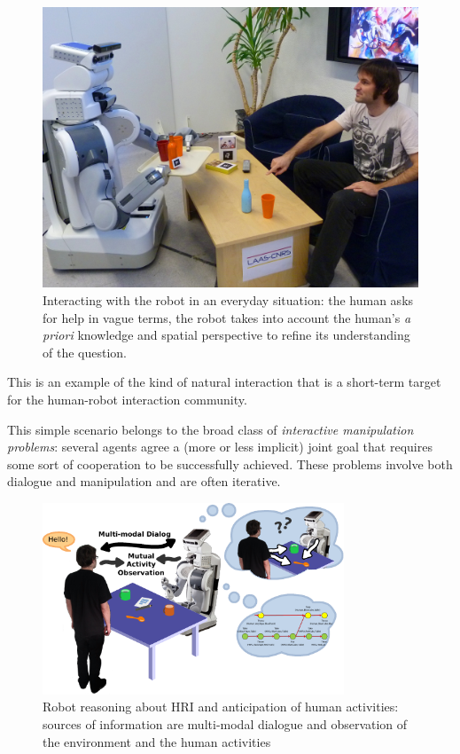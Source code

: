 \documentclass{svmult}
\begin{document}
\begin{figure}%
	\centering
	\includegraphics[width=0.8\linewidth]{figs/aperitif_time.jpg} 

	\caption{Interacting with the robot in an everyday situation: the human
	asks for help in vague terms, the robot takes into account the human's {\it
	a priori} knowledge and spatial perspective to refine its understanding of
	the question.} 

	\label{fig|vpt} 
\end{figure}

This is an example of the kind of natural interaction that is a short-term
target for the human-robot interaction community.

This simple scenario belongs to the broad class of \emph{interactive
manipulation problems}: several agents agree a (more or less implicit) joint
goal that requires some sort of cooperation to be successfully achieved. These
problems involve both dialogue and manipulation and are often iterative.


\begin{figure}[htb]
\centering
\includegraphics[width=9cm]{figs/grounding_robot.pdf}
\caption{Robot reasoning about HRI and anticipation of human activities:
  sources of information are multi-modal dialogue and observation of
  the environment and the human activities}
\label{fig|hri-dec}
\end{figure}
\end{document}
